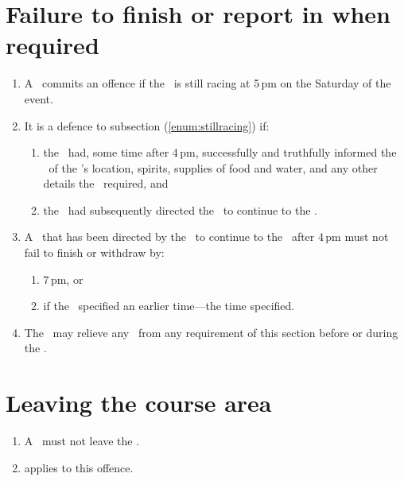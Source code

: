 \documentclass[12pt]{report}
\begin{document}
    \section{Failure to finish or report in when required}\amended
  \begin{enumerate}
    \item A \team\ commits an offence if the \team\ is still racing at 5\,pm on the Saturday of the event.\label{enum:stillracing}

    \item It is a defence to subsection \thesection(\ref{enum:stillracing}) if:
    \begin{enumerate}
      \item the \team\ had, some time after 4\,pm, successfully and truthfully informed the \RaceDirector\ of the \team's location, spirits,  supplies of food and water, and any other details the \RaceDirector\ required, and
          \item the \RaceDirector\ had subsequently directed the \team\ to continue to the \Endpoint.
    \end{enumerate}
    \item A \team\ that has been directed by the \RaceDirector\ to continue to the \Endpoint\ after 4\,pm must not fail to finish or withdraw by:
        \begin{enumerate}
        \item 7\,pm, or
        \item if the \RaceDirector\ specified an earlier time---the time specified.
        \end{enumerate}

    \item The \RaceDirector\ may relieve any \team\ from any requirement of this section before or during the \race.
  \end{enumerate}
  \section{Leaving the course area}
  \begin{enumerate}
    \item A \team\ must not leave the \coursearea.

    \item {} applies to this offence.
  \end{enumerate}
\end{document}
